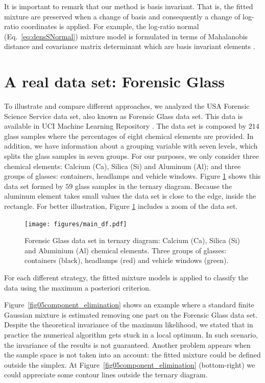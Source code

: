 \documentclass[10pt, a4paper]{article}
\begin{document}
It is important to remark that our method is basis invariant. That is, the fitted mixture are preserved when a change of basis and consequently a change of log-ratio coordinates is applied. For example, the log-ratio normal (Eq.~\ref{eq:densSNormal}) mixture model is formulated in terms of Mahalanobis distance and covariance matrix determinant which are basis invariant elements
 \citep{barcelo1999comment}. 

\section{A real data set: Forensic Glass}
\label{example_section}

\noindent To illustrate and compare different approaches, we analyzed the USA Forensic Science Service data set, also known as Forensic Glass data set. This data is available in UCI Machine Learning Repository \cite{Bache+Lichman:2013}.  The data set is composed by  $214$ glass samples where the percentages of eight chemical elements are provided. In addition, we have information about a grouping variable with seven levels, which splits the glass samples in seven groups. For our purposes, we only consider three chemical elements: Calcium (Ca), Silica (Si) and Aluminum (Al); and three groups of glasses: containers, headlamps and vehicle windows. Figure \ref{fig04} shows this data set formed by $59$ glass samples in the ternary diagram. Because the aluminum element takes small values the data set is close to the edge, inside the rectangle. For better illustration, Figure \ref{fig04} includes a zoom of the data set.


\begin{figure}[htbp]
\centering
\texttt{[image: figures/main\_df.pdf]}%
\caption{Forensic Glass data set in ternary diagram: Calcium (Ca), Silica (Si) and Aluminium (Al) chemical elements. Three groups of glasses: containers (black), headlamps (red) and vehicle windows (green).}
\label{fig04}
\end{figure}

For each different strategy, the fitted mixture models is applied to classify the data using the maximum a posteriori criterion.

Figure~\ref{fig05component_elimination} shows an example where a standard finite Gaussian mixture is estimated removing one part on the Forensic Glass data set. Despite the theoretical invariance of the maximum likelihood, we stated that in practice the numerical algorithm gets stuck in a local optimum. In such scenario, the invariance of the results is not guaranteed. Another problem appears when the sample space is not taken into an account: the fitted mixture could be defined outside the simplex. At Figure~\ref{fig05component_elimination} (bottom-right) we could appreciate some contour lines outside the ternary diagram.
\end{document}
